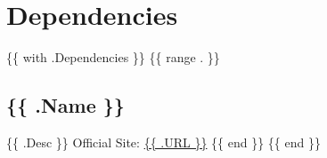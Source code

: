 \section{Dependencies}

\{\{ with .Dependencies \}\}
\{\{ range . \}\}
\subsection{\{\{ .Name \}\}}
\{\{ .Desc \}\}
Official Site: \url{\{\{ .URL \}\}}
\{\{ end \}\}
\{\{ end \}\}
